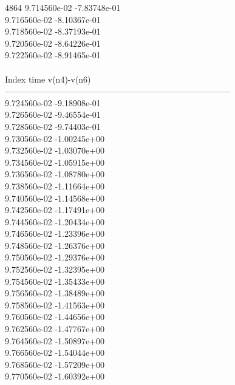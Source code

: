4864	9.714560e-02	-7.83748e-01	\\ 	9.716560e-02	-8.10367e-01	\\ 	9.718560e-02	-8.37193e-01	\\ 	9.720560e-02	-8.64226e-01	\\ 	9.722560e-02	-8.91465e-01	\\ \hline
\\ \hline
Index   time            v(n4)-v(n6)     \\ \hline
--------------------------------------------------------------------------------\\ 	9.724560e-02	-9.18908e-01	\\ 	9.726560e-02	-9.46554e-01	\\ 	9.728560e-02	-9.74403e-01	\\ 	9.730560e-02	-1.00245e+00	\\ 	9.732560e-02	-1.03070e+00	\\ 	9.734560e-02	-1.05915e+00	\\ 	9.736560e-02	-1.08780e+00	\\ 	9.738560e-02	-1.11664e+00	\\ 	9.740560e-02	-1.14568e+00	\\ 	9.742560e-02	-1.17491e+00	\\ 	9.744560e-02	-1.20434e+00	\\ 	9.746560e-02	-1.23396e+00	\\ 	9.748560e-02	-1.26376e+00	\\ 	9.750560e-02	-1.29376e+00	\\ 	9.752560e-02	-1.32395e+00	\\ 	9.754560e-02	-1.35433e+00	\\ 	9.756560e-02	-1.38489e+00	\\ 	9.758560e-02	-1.41563e+00	\\ 	9.760560e-02	-1.44656e+00	\\ 	9.762560e-02	-1.47767e+00	\\ 	9.764560e-02	-1.50897e+00	\\ 	9.766560e-02	-1.54044e+00	\\ 	9.768560e-02	-1.57209e+00	\\ 	9.770560e-02	-1.60392e+00	\\ \hline
